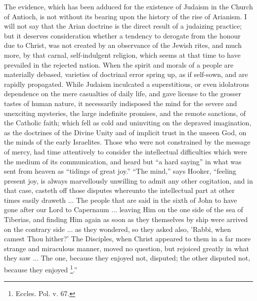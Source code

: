 The evidence, which has been adduced for the existence of Judaism
in the Church of Antioch, is not without its bearing upon the history
of the rise of Arianism. I will not say that the Arian doctrine is the
direct result of a judaizing practice; but it deserves consideration
whether a tendency to derogate from the honour due to Christ, was not
created by an observance of the Jewish rites, and much more, by that
carnal, self-indulgent religion, which seems at that time to have
prevailed in the rejected nation. When the spirit and morals of a
people are materially debased, varieties of doctrinal error spring up,
as if self-sown, and are rapidly propagated. While Judaism inculcated
a superstitious, or even idolatrous dependence on the mere casualties
of daily life, and gave license to the grosser tastes of human nature,
it necessarily indisposed the mind for the severe and unexciting
mysteries, the large indefinite promises, and the remote sanctions, of
the Catholic faith; which fell as cold and uninviting on the depraved
imagination, as the doctrines of the Divine Unity and of implicit
trust in the unseen God, on the minds of the early Israelites. Those
who were not constrained by the message of mercy, had time attentively
to consider the intellectual difficulties which were the medium of its
communication, and heard but ``a hard saying'' in what was
sent from heaven as ``tidings of great joy.'' ``The
mind,'' says Hooker, ``feeling present joy, is always
marvellously unwilling to admit any other cogitation, and in that
case, casteth off those disputes whereunto the intellectual part at
other times easily draweth ... The people that are said in the sixth
of John to have gone after our Lord to Capernaum ... leaving Him on
the one side of the sea of Tiberias, and finding Him again as soon as
they themselves by ship were arrived on the contrary side ... as they
wondered, so they asked also, 'Rabbi, when camest Thou hither?' The
Disciples, when Christ appeared to them in a far more strange and
miraculous manner, moved no question, but rejoiced greatly in what
they saw ... The one, because they enjoyed not, disputed; the other
disputed not, because they enjoyed \footnote{Eccles. Pol. v. 67.}.''

